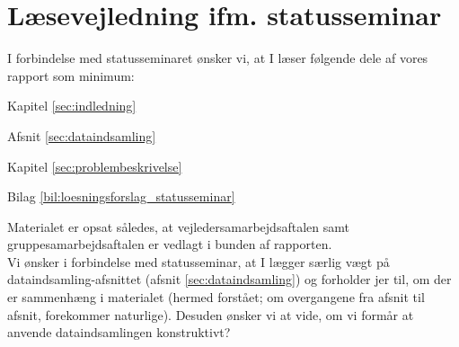 \chapter*{Læsevejledning ifm. statusseminar}

I forbindelse med statusseminaret ønsker vi, at I læser følgende dele af vores rapport som minimum:

\begin{itemize_small}

\item Kapitel \ref{sec:indledning}

\item Afsnit \ref{sec:dataindsamling}

\item Kapitel \ref{sec:problembeskrivelse}

\item Bilag \ref{bil:loesningsforslag_statusseminar}

\end{itemize_small}

Materialet er opsat således, at vejledersamarbejdsaftalen samt gruppesamarbejdsaftalen er vedlagt i bunden af rapporten. \\

Vi ønsker i forbindelse med statusseminar, at I lægger særlig vægt på dataindsamling-afsnittet (afsnit \ref{sec:dataindsamling}) og forholder jer til, om der er sammenhæng i materialet (hermed forstået; om overgangene fra afsnit til afsnit, forekommer naturlige). Desuden ønsker vi at vide, om vi formår at anvende dataindsamlingen konstruktivt?
